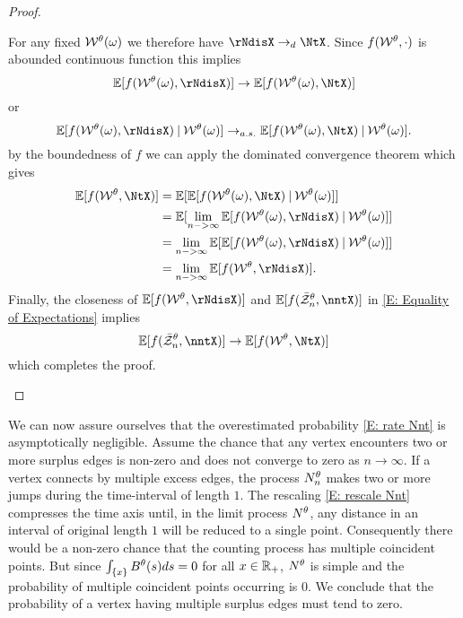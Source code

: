\begin{proof}
\begin{proofpart}
For any fixed $\mathcal{W}^{\theta}(\omega)$ we therefore have $\rNdisX \rightarrow_d \NtX$.
Since $f(\mathcal{W}^{\theta}, \cdot)$ is abounded continuous function this implies
\begin{equation}
	\Exp{f(\WtX(\omega), \rNdisX)} \rightarrow \Exp{f(\WtX(\omega), \NtX)}
\end{equation}
or
\begin{equation}
	\Exp{f(\WtX(\omega), \rNdisX) \cond \WtX(\omega)} \rightarrow_{a.s.} \Exp{f(\WtX(\omega), \NtX)\cond \WtX(\omega)}.
\end{equation}
by the boundedness of $f$ we can apply the dominated convergence theorem which gives
\begin{equation}
	\begin{aligned}
	\Exp{f(\WtX, \NtX)}
	&= \Exp{ \Exp{f(\WtX(\omega), \NtX) \cond \WtX(\omega)} } \\
	&= \Exp{ \lim_{n->\infty} \Exp{f(\WtX(\omega), \rNdisX) \cond \WtX(\omega)} } \\
	&= \lim_{n->\infty} \Exp{ \Exp{f(\WtX(\omega), \rNdisX) \cond \WtX(\omega)} } \\
	&= \lim_{n->\infty} \Exp{ f(\WtX, \rNdisX) }.
	\end{aligned}
\end{equation}
Finally, the closeness of $\Exp{ f(\WtX, \rNdisX) }$ and $\Exp{f(\rzntX, \nntX)}$ in \eqref{E: Equality of Expectations} implies
\begin{equation}
	\Exp{f(\rzntX, \nntX)} \rightarrow \Exp{f(\WtX, \NtX)}
\end{equation}
which completes the proof.
\end{proofpart}
\end{proof}


We can now assure ourselves that the overestimated probability \eqref{E: rate Nnt} is asymptotically negligible.
Assume the chance that any vertex encounters two or more surplus edges is non-zero and does not converge to zero as $n \rightarrow \infty$.
If a vertex connects by multiple excess edges, the process $N_n^{\theta}$ makes two or more jumps during the time-interval of length $1$.
The rescaling \eqref{E: rescale Nnt} compresses the time axis until, in the limit process $N^{\theta}$, 
any distance in an interval of original length $1$ will be reduced to a single point.
Consequently there would be a non-zero chance that the counting process has multiple coincident points.
But since $\int_{\{x\}} B^{\theta}(s)ds = 0$ for all $x \in \mathbb{R}_+$, 
$N^{\theta}$ is simple and the probability of multiple coincident points occurring is $0$.
We conclude that the probability of a vertex having multiple surplus edges must tend to zero.


